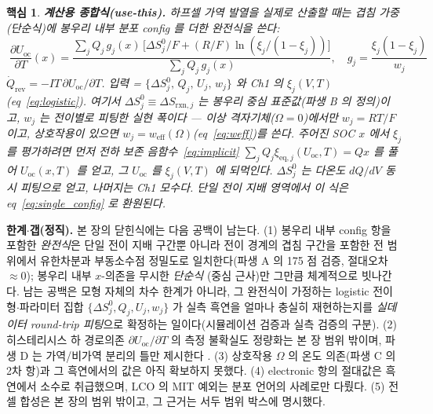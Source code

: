 \documentclass[11pt,a4paper]{article}
\newtheorem*{keybox}{핵심}
\newcommand{\rxn}{\mathrm{rxn}}
\newcommand{\eq}{\mathrm{eq}}
\newcommand{\rev}{\mathrm{rev}}
\newcommand{\oc}{\mathrm{oc}}
\newcommand{\eff}{\mathrm{eff}}
\begin{document}
\begin{keybox}
\textbf{계산용 종합식(use-this).} 하프셀 가역 발열을 실제로 산출할 때는 겹침 가중(단순식)에 봉우리 내부 분포
config 를 더한 \emph{완전식}을 쓴다:
\[
\boxed{\;\frac{\partial U_\oc}{\partial T}(x)
=\frac{\sum_j Q_j\,g_j(x)\,\bigl[\Delta S^0_j/F+(R/F)\ln(\xi_j/(1-\xi_j))\bigr]}{\sum_j Q_j\,g_j(x)},\quad
g_j=\frac{\xi_j(1-\xi_j)}{w_j}\;}
\]
$\dot Q_\rev=-IT\,\partial U_\oc/\partial T$. \emph{입력} = $\{\Delta S^0_j,\,Q_j,\,U_j,\,w_j\}$ 와 Ch1 의
$\xi_j(V,T)$(eq~\eqref{eq:logistic}). 여기서 $\Delta S^0_j\equiv\Delta S_{\rxn,j}$ 는 봉우리 중심 표준값(파생 B 의
정의)이고, $w_j$ 는 전이별로 피팅한 \emph{실현 폭}이다 — 이상 격자기체($\Omega=0$)에서만 $w_j=RT/F$ 이고, 상호작용이
있으면 $w_j=w_\eff(\Omega)$(eq~\eqref{eq:weff})를 쓴다. 주어진 SOC $x$ 에서 $\xi_j$ 를 평가하려면 먼저 전하 보존
음함수~\eqref{eq:implicit} $\sum_j Q_j\xi_{\eq,j}(U_\oc,T)=Qx$ 를 풀어 $U_\oc(x,T)$ 를 얻고, 그 $U_\oc$ 를
$\xi_j(V,T)$ 에 되먹인다. $\Delta S^0_j$ 는 다온도 $dQ/dV$ 동시 피팅으로 얻고, 나머지는 Ch1 모수다.
단일 전이 지배 영역에서 이 식은 eq~\eqref{eq:single_config} 로 환원된다.
\end{keybox}

\textbf{한계$\cdot$갭(정직).} 본 장의 닫힌식에는 다음 공백이 남는다. (1) 봉우리 내부 config 항을 포함한
\emph{완전식}은 단일 전이 지배 구간뿐 아니라 전이 경계의 겹침 구간을 포함한 전 범위에서 유한차분과 부동소수점
정밀도로 일치한다(파생 A 의 175 점 검증, 절대오차 $\approx0$); 봉우리 내부 $x$-의존을 무시한 \emph{단순식}
(중심 근사)만 그만큼 체계적으로 빗나간다. 남는 공백은
모형 자체의 차수 한계가 아니라, 그 완전식이 가정하는 logistic 전이형$\cdot$파라미터 집합 $\{\Delta S^0_j,Q_j,U_j,w_j\}$
가 실측 흑연을 얼마나 충실히 재현하는지를 \emph{실데이터 round-trip 피팅}으로 확정하는 일이다(시뮬레이션 검증과
실측 검증의 구분). (2) 히스테리시스 하 경로의존 $\partial U_\oc/\partial T$ 의 측정 불확실도
정량화는 본 장 범위 밖이며, 파생 D 는 가역/비가역 분리의 틀만 제시한다 \cite{hysteresis2018}. (3) 상호작용
$\Omega$ 의 온도 의존(파생 C 의 2차 항)과 그 흑연에서의 값은 아직 확보하지 못했다. (4) electronic 항의 절대값은
흑연에서 소수로 취급했으며, LCO 의 MIT 예외는 분포 언어의 사례로만 다뤘다. (5) 전셀 합성은 본 장의 범위
밖이고, 그 근거는 서두 범위 박스에 명시했다.
\end{document}
